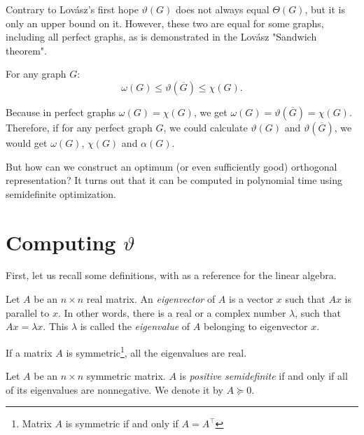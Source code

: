 Contrary to Lovász's first hope \cite{Lovasz1979} $\vartheta(G)$ does not always equal $\Theta(G)$, but it is only an upper bound on it. However, these two are equal for some graphs, including all perfect graphs, as is demonstrated in the Lovász "Sandwich theorem".

\begin{theorem}
  \label{thm:sandwich}
  For any graph $G$:
  $$ \omega(G) \leq \vartheta(\overline{G}) \leq \chi(G).$$
\end{theorem}

Because in perfect graphs $\omega(G) = \chi(G)$, we get $\omega(G) = \vartheta(\overline{G}) = \chi(G)$. Therefore, if for any perfect graph $G$, we could calculate $\vartheta(G)$ and $\vartheta(\overline{G})$, we would get $\omega(G)$, $\chi(G)$ and $\alpha(G)$.

But how can we construct an optimum (or even sufficiently good) orthogonal representation? It turns out that it can be computed in polynomial time using semidefinite optimization.

\section{Computing \boldmath$\vartheta$}
\label{sec:computingTheta}

First, let us recall some definitions, with \cite{gilbertstrang2020} as a reference for the linear algebra.

\begin{defn}
  Let $A$ be an $n \times n$ real matrix. An \emph{eigenvector} of $A$ is a vector $x$ such that $Ax$ is parallel to $x$. In other words, there is a real or a complex number $\lambda$, such that $Ax = \lambda x$. This $\lambda$ is called the \emph{eigenvalue} of $A$ belonging to eigenvector $x$.
\end{defn}

If a matrix $A$ is symmetric\footnote{Matrix $A$ is symmetric if and only if $A = A^\intercal$}, all the eigenvalues are real.

\begin{defn}
  Let $A$ be an $n \times n$ symmetric matrix. $A$ is \emph{positive semidefinite} if and only if all of its eigenvalues are nonnegative. We denote it by $A \succeq 0$.
\end{defn}

